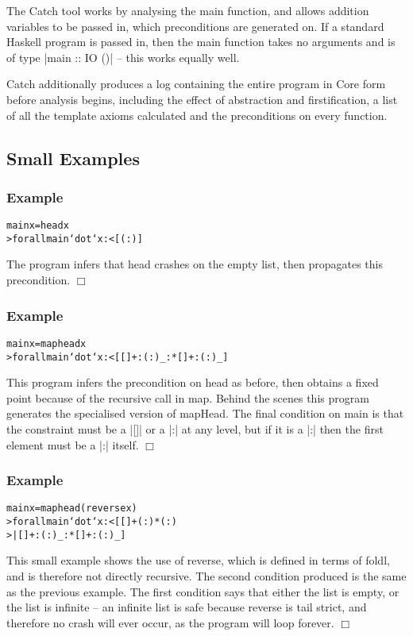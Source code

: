 \documentclass[preprint]{sigplanconf}
\newcommand{\C}[1]{\textsf{#1}}
\newcounter{exmp}
\newcommand{\yesexample}{\subsubsection*{Example \arabic{exmp}}\addtocounter{exmp}{1}}
\newcommand{\noexample}{\hfill$\Box$}
\newenvironment{code}{\begin{alltt}\small}{\end{alltt}}
\newenvironment{example}{\yesexample}{\noexample}
\begin{document}
The Catch tool works by analysing the \C{main} function, and allows addition variables to be passed in, which preconditions are generated on. If a standard Haskell program is passed in, then the \C{main} function takes no arguments and is of type |main :: IO ()| -- this works equally well.

Catch additionally produces a log containing the entire program in Core form before analysis begins, including the effect of abstraction and firstification, a list of all the template axioms calculated and the preconditions on every function.

\subsection{Small Examples}

\begin{example}
\begin{code}
main x = head x
> forall main `dot` x :< [ (:) ]
\end{code}

The program infers that \C{head} crashes on the empty list, then propagates this precondition.
\end{example}

\begin{example}
\begin{code}
main x = map head x
> forall main `dot` x :< [ [] + : (:) _ :* [] + : (:) _ ]
\end{code}

This program infers the precondition on \C{head} as before, then obtains a fixed point because of the recursive call in \C{map}. Behind the scenes this program generates the specialised version of \C{mapHead}. The final condition on \C{main} is that the constraint must be a |[]| or a |:| at any level, but if it is a |:| then the first element must be a |:| itself.
\end{example}

\begin{example}
\begin{code}
main x = map head (reverse x)
> forall main `dot` x :<  [ [] + (:) * (:)
>                         | [] + : (:) _ :* [] + : (:) _]
\end{code}

This small example shows the use of \C{reverse}, which is defined in terms of \C{foldl}, and is therefore not directly recursive. The second condition produced is the same as the previous example. The first condition says that either the list is empty, or the list is infinite -- an infinite list is safe because \C{reverse} is tail strict, and therefore no crash will ever occur, as the program will loop forever.
\end{example}
\end{document}
